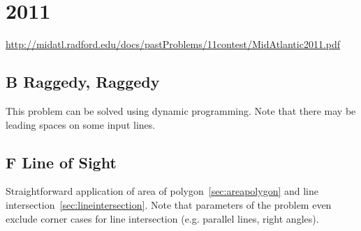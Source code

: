 
\section{2011}

\href{(Problem PDF 2011)}{http://midatl.radford.edu/docs/pastProblems/11contest/MidAtlantic2011.pdf}

\subsection{B Raggedy, Raggedy}
\label{sec:2011-b-raggedy}

This problem can be solved using dynamic programming.
Note that there may be leading spaces on some input lines.

\subsection{F Line of Sight}
\label{sec:2011-f-lineofsight}

Straightforward application of area of polygon~\ref{sec:areapolygon} and line intersection~\ref{sec:lineintersection}.
Note that parameters of the problem even exclude corner cases for line intersection (e.g. parallel lines, right angles).

